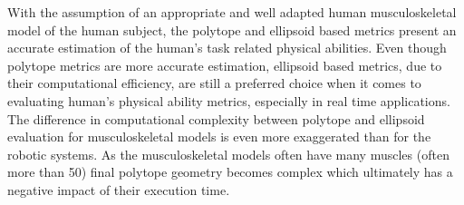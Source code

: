 With the assumption of an appropriate and well adapted human musculoskeletal model of the human subject, the polytope and ellipsoid based metrics present an accurate estimation of the human's task related physical abilities. 
Even though polytope metrics are more accurate estimation, ellipsoid based metrics, due to their computational efficiency, are still a preferred choice when it comes to evaluating human's physical ability metrics, especially in real time applications. The difference in computational complexity between polytope and ellipsoid evaluation for musculoskeletal models is even more exaggerated than for the robotic systems. As the musculoskeletal models often have many muscles (often more than 50) final polytope geometry becomes complex which ultimately has a negative impact of their execution time.

